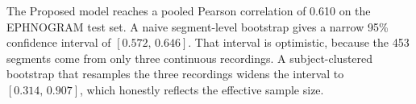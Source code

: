 The Proposed model reaches a pooled Pearson correlation of 0.610 on the EPHNOGRAM test set. A naive segment-level bootstrap gives a narrow 95\% confidence interval of $[0.572,\,0.646]$. That interval is optimistic, because the 453 segments come from only three continuous recordings. A subject-clustered bootstrap that resamples the three recordings widens the interval to $[0.314,\,0.907]$, which honestly reflects the effective sample size.
